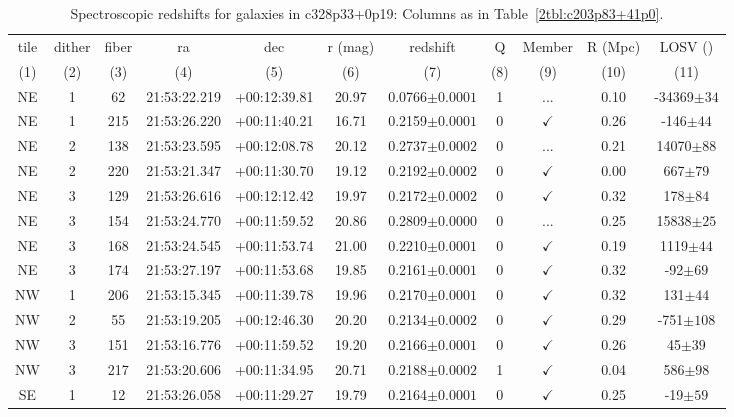 \begin{landscape}
	\begin{table}
		\centering 
		\caption[Spectroscopic redshifts for galaxies in c328p33+0p19.]{Spectroscopic redshifts for galaxies in c328p33+0p19: Columns as in Table~\ref{2tbl:c203p83+41p0}.}
		\begin{tabular}{ccccccccccc}
			\hline
			tile & dither & fiber & ra & dec & r (mag) & redshift & Q & Member & R (Mpc) & LOSV (\kms) \\
			(1) & (2) & (3) & (4) & (5) & (6) & (7) & (8) & (9) & (10) & (11) \\
			\hline \hline
	NE & 1 & 62 & 21:53:22.219 & +00:12:39.81 & 20.97 & 0.0766$\pm{0.0001}$ & 1 & ... & 0.10 & -34369$\pm{34}$ \\
	NE & 1 & 215 & 21:53:26.220 & +00:11:40.21 & 16.71 & 0.2159$\pm{0.0001}$ & 0 & $\checkmark$ & 0.26 & -146$\pm{44}$ \\
	NE & 2 & 138 & 21:53:23.595 & +00:12:08.78 & 20.12 & 0.2737$\pm{0.0002}$ & 0 & ... & 0.21 & 14070$\pm{88}$ \\
	NE & 2 & 220 & 21:53:21.347 & +00:11:30.70 & 19.12 & 0.2192$\pm{0.0002}$ & 0 & $\checkmark$ & 0.00 & 667$\pm{79}$ \\
	NE & 3 & 129 & 21:53:26.616 & +00:12:12.42 & 19.97 & 0.2172$\pm{0.0002}$ & 0 & $\checkmark$ & 0.32 & 178$\pm{84}$ \\
	NE & 3 & 154 & 21:53:24.770 & +00:11:59.52 & 20.86 & 0.2809$\pm{0.0000}$ & 0 & ... & 0.25 & 15838$\pm{25}$ \\
	NE & 3 & 168 & 21:53:24.545 & +00:11:53.74 & 21.00 & 0.2210$\pm{0.0001}$ & 0 & $\checkmark$ & 0.19 & 1119$\pm{44}$ \\
	NE & 3 & 174 & 21:53:27.197 & +00:11:53.68 & 19.85 & 0.2161$\pm{0.0001}$ & 0 & $\checkmark$ & 0.32 & -92$\pm{69}$ \\
	NW & 1 & 206 & 21:53:15.345 & +00:11:39.78 & 19.96 & 0.2170$\pm{0.0001}$ & 0 & $\checkmark$ & 0.32 & 131$\pm{44}$ \\
	NW & 2 & 55 & 21:53:19.205 & +00:12:46.30 & 20.20 & 0.2134$\pm{0.0002}$ & 0 & $\checkmark$ & 0.29 & -751$\pm{108}$ \\
	NW & 3 & 151 & 21:53:16.776 & +00:11:59.52 & 19.20 & 0.2166$\pm{0.0001}$ & 0 & $\checkmark$ & 0.26 & 45$\pm{39}$ \\
	NW & 3 & 217 & 21:53:20.606 & +00:11:34.95 & 20.71 & 0.2188$\pm{0.0002}$ & 1 & $\checkmark$ & 0.04 & 586$\pm{98}$ \\
	SE & 1 & 12 & 21:53:26.058 & +00:11:29.27 & 19.79 & 0.2164$\pm{0.0001}$ & 0 & $\checkmark$ & 0.25 & -19$\pm{59}$ \\

\end{tabular}
\end{table}
\end{landscape}
